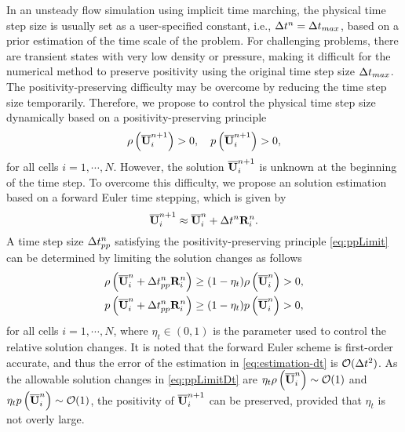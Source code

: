 In an unsteady flow simulation using implicit time marching, the physical time step size is usually set as a user-specified constant, i.e., $\mathrm\Delta t^n= \mathrm\Delta t_{max}$, based on a prior estimation of the time scale of the problem. For challenging problems, there are transient states with very low density or pressure, making it difficult for the numerical method to preserve positivity using the original time step size $\mathrm\Delta t_{max}$.
The positivity-preserving difficulty may be overcome by reducing the time step size temporarily. Therefore, we propose to control the physical time step size dynamically based on a positivity-preserving principle
\begin{equation}
    \label{eq:ppLimit}
    \rho\left(\overline{\mathbf{U}}_i^{n+1} \right)>0, \quad
    p\left(\overline{\mathbf{U}}_i^{n+1}\right)>0 ,
\end{equation}
for all cells $i=1, \cdots,N$.
However, the solution $\overline{\mathbf{U}}_i^{n+1}$ is unknown at the beginning of the time step. To overcome this difficulty, we propose an solution estimation based on a forward Euler time stepping, which is given by
\begin{equation}
    \label{eq:estimation-dt}
    \overline{\mathbf{U}}_i^{n+1} \approx  \overline{\mathbf{U}}_i^n + \mathrm\Delta t^{n}  \mathbf{R}_i^n.
\end{equation}
A time step size $ \mathrm\Delta t^{n}_{pp}$ satisfying the positivity-preserving principle \eqref{eq:ppLimit} can be determined by limiting the solution changes as follows
\begin{equation}
    \label{eq:ppLimitDt}
    \begin{aligned}
        \rho\left(\overline{\mathbf{U}}_i^n + \mathrm\Delta t^{n}_{pp}\mathbf{R}_i^n\right)
         & \geq
        (1- \eta_t)
        \rho\left(\overline{\mathbf{U}}_i^n\right)>0, \\
        p\left(\overline{\mathbf{U}}_i^n + \mathrm\Delta t^{n}_{pp}\mathbf{R}_i^n\right)
         & \geq
        (1- \eta_t)
        p\left(\overline{\mathbf{U}}_i^n\right)>0,
    \end{aligned}
\end{equation}
for all cells $i=1, \cdots,N$, where $\eta_t\in(0,1)$ is the parameter used to control the relative solution changes. It is noted that the forward Euler scheme is first-order accurate, and thus the error of the estimation in \eqref{eq:estimation-dt} is $\mathcal{O}(\mathrm\Delta t^2)$. As the allowable solution changes in \eqref{eq:ppLimitDt} are $\eta_t \rho\left(\overline{\mathbf{U}}_i^n\right) \sim \mathcal{O}(1)$ and $\eta_t p\left(\overline{\mathbf{U}}_i^n\right) \sim \mathcal{O}(1)$, the positivity of $\overline{\mathbf{U}}_i^{n+1}$  can be preserved, provided that $\eta_t$ is not overly large.

